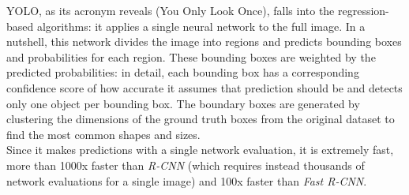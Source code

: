 \documentclass[../report.tex]{subfiles}
\begin{document}
\noindent
YOLO, as its acronym reveals (You Only Look Once), falls into the regression-based algorithms: it applies a single neural network to the full image. In a nutshell, this network divides the image into regions and predicts bounding boxes and probabilities for each region. These bounding boxes are weighted by the predicted probabilities: in detail, each bounding box has a corresponding confidence score of how accurate it assumes that prediction should be and detects only one object per bounding box. The boundary boxes are generated by clustering the dimensions of the ground truth boxes from the original dataset to find the most common shapes and sizes.\\
\noindent
Since it makes predictions with a single network evaluation, it is extremely fast, more than 1000x faster than \textit{R-CNN} (which requires instead thousands of network evaluations for a single image) and 100x faster than \textit{Fast R-CNN}.
\end{document}
